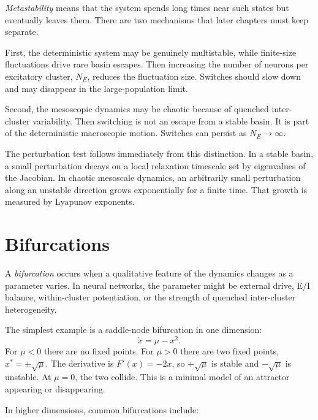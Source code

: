 \emph{Metastability} means that the system spends long times near such states but eventually leaves them. There are two mechanisms that later chapters must keep separate.

First, the deterministic system may be genuinely multistable, while finite-size fluctuations drive rare basin escapes. Then increasing the number of neurons per excitatory cluster, $N_E$, reduces the fluctuation size. Switches should slow down and may disappear in the large-population limit.

Second, the mesoscopic dynamics may be chaotic because of quenched inter-cluster variability. Then switching is not an escape from a stable basin. It is part of the deterministic macroscopic motion. Switches can persist as $N_E\to\infty$.

The perturbation test follows immediately from this distinction. In a stable basin, a small perturbation decays on a local relaxation timescale set by eigenvalues of the Jacobian. In chaotic mesoscale dynamics, an arbitrarily small perturbation along an unstable direction grows exponentially for a finite time. That growth is measured by Lyapunov exponents.

\section{Bifurcations}
\label{sec:bifurcations}

A \emph{bifurcation} occurs when a qualitative feature of the dynamics changes as a parameter varies. In neural networks, the parameter might be external drive, E/I balance, within-cluster potentiation, or the strength of quenched inter-cluster heterogeneity.

The simplest example is a saddle-node bifurcation in one dimension:
%
\begin{equation}
  \dot{x} = \mu - x^2.
  \label{eq:saddle-node-normal-form}
\end{equation}
%
For $\mu<0$ there are no fixed points. For $\mu>0$ there are two fixed points, $x^\ast=\pm\sqrt{\mu}$. The derivative is $F'(x)=-2x$, so $+\sqrt{\mu}$ is stable and $-\sqrt{\mu}$ is unstable. At $\mu=0$, the two collide. This is a minimal model of an attractor appearing or disappearing.

In higher dimensions, common bifurcations include:

